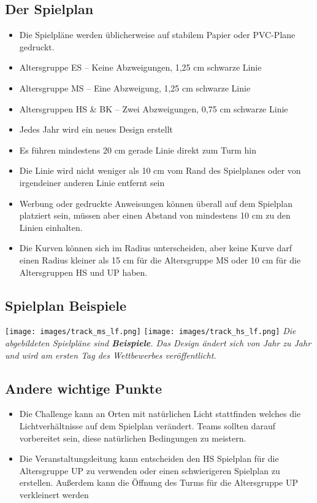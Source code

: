 \documentclass[a4paper,12pt]{article}
\begin{document}
\subsection{Der Spielplan}
\begin{itemize}
	\item Die Spielpläne werden üblicherweise auf stabilem Papier oder PVC-Plane gedruckt.
	\item Altersgruppe ES – Keine Abzweigungen, 1,25 cm schwarze Linie
	\item Altersgruppe MS – Eine Abzweigung, 1,25 cm schwarze Linie
	\item Altersgruppen HS \& BK – Zwei Abzweigungen, 0,75 cm schwarze Linie
	\item Jedes Jahr wird ein neues Design erstellt
	\item Es führen mindestens 20 cm gerade Linie direkt zum Turm hin
	\item Die Linie wird nicht weniger als 10 cm vom Rand des Spielplanes
		oder von irgendeiner anderen Linie entfernt sein
	\item Werbung oder gedruckte Anweisungen können überall auf dem
		Spielplan platziert sein, müssen aber einen Abstand von
		mindestens 10 cm zu den Linien einhalten.
	\item Die Kurven können sich im Radius unterscheiden, aber keine Kurve
		darf einen Radius kleiner als 15 cm für die Altersgruppe MS oder 10 cm für die
		Altersgruppen HS und UP haben.
\end{itemize}
\subsection{Spielplan Beispiele}
\texttt{[image: images/track\_ms\_lf.png]}
\texttt{[image: images/track\_hs\_lf.png]}
\emph{Die abgebildeten Spielpläne sind \textbf{Beispiele}. Das Design ändert sich von Jahr zu
Jahr und wird am ersten Tag des Wettbewerbes veröffentlicht.}
\subsection{Andere wichtige Punkte }
\begin{itemize}
	\item Die Challenge kann an Orten mit natürlichen Licht stattfinden
		welches die Lichtverhältnisse auf dem Spielplan verändert.
		Teams sollten darauf vorbereitet sein, diese natürlichen
		Bedingungen zu meistern.
	\item Die Veranstaltungsleitung kann entscheiden den HS Spielplan für
		die Altersgruppe UP zu verwenden oder einen schwierigeren
		Spielplan zu erstellen. Außerdem kann die Öffnung des Turms für
		die Altersgruppe UP verkleinert werden
\end{itemize}
\end{document}
